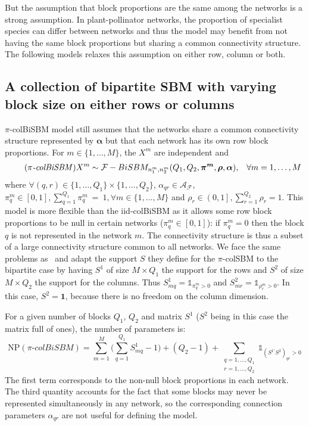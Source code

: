 \documentclass[12pt,a4paper]{report}
\begin{document}
But the assumption that block proportions are the same among the networks is a
strong assumption. In plant-pollinator networks, the proportion of specialist
species can differ between networks and thus the model may benefit from not
having the same block proportions but sharing a common connectivity structure.
The following models relaxes this assumption on either row, column or both.

\subsection{A collection of bipartite SBM with varying block size on either rows or columns}\label{ssec:a-collection-of-bipartite-sbm-with-varying-block-size-on-either-rows-or-columns}

$\pi$-colBiSBM model still assumes that the networks share a common connectivity
structure represented by $\bm{\alpha}$ but that each network has its own row
block proportions. For $m \in \{1,\dots,M\}$, the $X^m$ are independent and
\begin{align}
    \tag{\emph{$\pi$-colBiSBM}}
    X^m \sim \mathcal{F}-BiSBM_{n_1^m,n_2^m} (Q_1, Q_2, \bm{\pi^m}, \bm{\rho}, \bm{\alpha}), && \forall m = 1, \dots, M
\end{align}
where $\forall (q,r) \in \{1,\dots,Q_1\}\times\{1,\dots,Q_2\}$, $\alpha_{qr} \in \mathcal{A}_{\mathcal{F}}$,
$\pi^m_q \in \left[ 0,1 \right], \sum_{q=1}^{Q_1} \pi^m_q~=~1, \forall m \in \{1,\dots,M\}$ and $\rho_r \in \left( 0,1 \right], \sum_{r=1}^{Q_2} \rho_r = 1 $.
This model is more flexible than the iid-colBiSBM as it allows some row block
proportions to be null
in certain networks ($\pi^m_q\in\left[ 0,1 \right]$): if $\pi_q^m = 0$ then the
block $q$ is not represented in the network $m$. The connectivity structure is
thus a subset of a large connectivity structure common to all networks. We face
the same problems as~\cite{chabert-liddellLearningCommonStructures2023} and
adapt the support $S$ they define for the $\pi$-colSBM to the bipartite case by
having $S^1$ of size $M\times Q_1$ the support for the rows and $S^2$ of size
$M\times Q_2$ the support for the columns. Thus
$S^1_{mq} = \mathbb{1}_{\pi^m_q > 0}$ and
$S^2_{mr} = \mathbb{1}_{\rho^m_r > 0}$. In this case, $S^2 = \bm{1}$, because
there is no freedom on the column dimension.

For a given number of blocks $Q_1$, $Q_2$ and matrix $S^1$ ($S^2$ being in this case the matrix full of ones), the number of
parameters is:
\begin{equation*}
    \text{NP}(\pi\text{-}colBiSBM) = \sum_{m=1}^{M}\Bigg( \sum_{q=1}^{Q_1} S^1_{mq} - 1 \Bigg) + (Q_2 - 1) + \sum_{\substack{q=1,\dots,Q_1 \\ r=1,\dots,Q_2}} \mathbb{1}_{{(S^{1\prime}S^2)}_{qr}>0}
\end{equation*}
The first term corresponds to the non-null block proportions in each network.
The third quantity accounts for the fact that some blocks may never be
represented simultaneously in any network, so the corresponding connection
parameters $\alpha_{qr}$ are not useful for defining the model.
\end{document}
